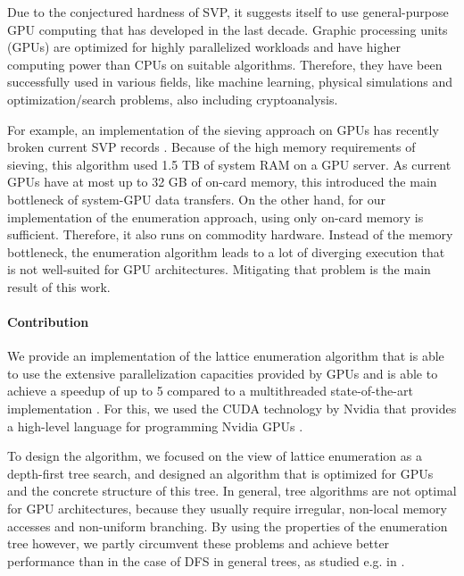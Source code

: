 \documentclass{scrartcl}
\begin{document}
    Due to the conjectured hardness of SVP, it suggests itself to use general-purpose GPU computing that has developed in the last decade.
    Graphic processing units (GPUs) are optimized for highly parallelized workloads and have higher computing power than CPUs on suitable algorithms.
    Therefore, they have been successfully used in various fields, like machine learning, physical simulations and optimization/search problems, also including cryptoanalysis.
    
    For example, an implementation of the sieving approach on GPUs has recently broken current SVP records \cite{sieving_gpu}.
    Because of the high memory requirements of sieving, this algorithm used 1.5 TB of system RAM on a GPU server. As current GPUs have at most up to 32 GB of on-card memory, this introduced the main bottleneck of system-GPU data transfers.
    On the other hand, for our implementation of the enumeration approach, using only on-card memory is sufficient. Therefore, it also runs on commodity hardware.
    Instead of the memory bottleneck, the enumeration algorithm leads to a lot of diverging execution that is not well-suited for GPU architectures.
    Mitigating that problem is the main result of this work.

    \paragraph{Contribution}
    We provide an implementation of the lattice enumeration algorithm that is able to use the extensive parallelization capacities provided by GPUs and is able to achieve a speedup of up to 5 compared to a multithreaded state-of-the-art implementation \cite{fplll}.
    For this, we used the CUDA technology by Nvidia that provides a high-level language for programming Nvidia GPUs \cite{cuda}.
    
    To design the algorithm, we focused on the view of lattice enumeration as a depth-first tree search, and designed an algorithm that is optimized for GPUs and the concrete structure of this tree. 
    In general, tree algorithms are not optimal for GPU architectures, because they usually require irregular, non-local memory accesses and non-uniform branching.
    By using the properties of the enumeration tree however, we partly circumvent these problems and achieve better performance than in the case of DFS in general trees, as studied e.g. in \cite{tree_search_cuda}.
\end{document}

